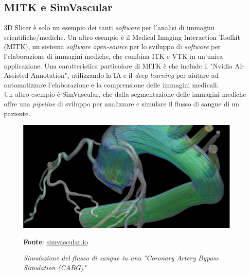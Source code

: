\subsection{MITK e SimVascular}
3D Slicer è solo un esempio dei tanti \emph{software} per l'analisi di immagini scientifiche/mediche. Un altro esempio è il Medical Imaging Interaction Toolkit (MITK), un sistema \emph{software} \emph{open-source} per lo sviluppo di \emph{software} per l'elaborazione di immagini mediche, che combina ITK e VTK in un'unica applicazione. Una caratteristica particolare di MITK è che include il "Nvidia AI-Assisted Annotation", utilizzando la IA e il \emph{deep learning} per aiutare ad automatizzare l'elaborazione e la comprensione delle immagini medicali.
\\
Un altro esempio è SimVascular, che dalla segmentazione delle immagini mediche offre una \emph{pipeline} di sviluppo per analizzare e simulare il flusso di sangue di un paziente.
\begin{figure}[h]
    \centering
    \includegraphics[scale=0.15]{immagini/volumerendering/simvascular.png}
    \caption{\textit{Simulazione del flusso di sangue in una "Coronary Artery Bypass Simulation (CABG)"}}
    \textbf{Fonte}: \href{http://simvascular.github.io/}{simvascular.io}
    \label{fig: SimVascular}
\end{figure}



